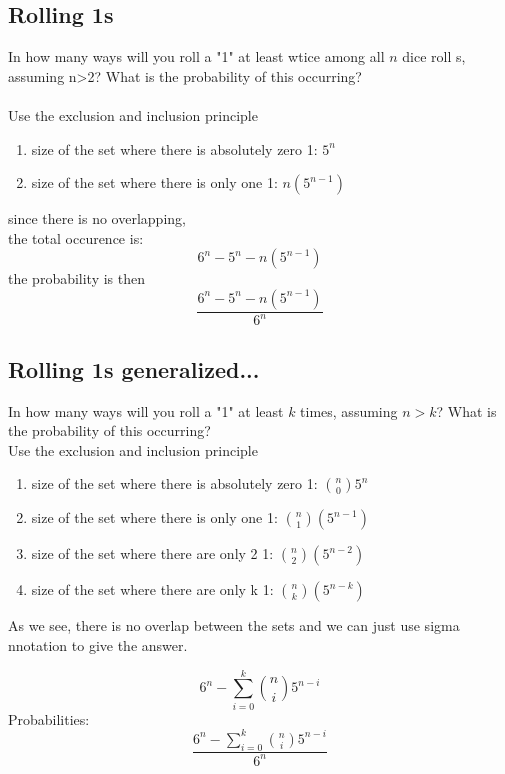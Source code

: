 \documentclass[a4paper,12pt]{article}
\begin{document}
\subsection{Rolling 1s}
In how many ways will you roll a "1" at least wtice among all $n$ dice roll s, assuming n>2? What is the probability of this occurring?\\
\bigskip\\
Use the exclusion and inclusion principle
\begin{enumerate}
  \item{size of the set where there is absolutely zero 1: $5^n$}
  \item{size of the set where there is only one 1: $n(5^{n-1})$}
\end{enumerate}
since there is no overlapping,\\
the total occurence is:
\[6^n - 5^n - n(5^{n-1})\]
the probability is then 
\[\frac{6^n - 5^n - n(5^{n-1})}{6^n}\]
\subsection{Rolling 1s generalized...}
In how many ways will you roll a "1" at least $k$ times, assuming $n > k$? 
What is the probability of this occurring?\\
Use the exclusion and inclusion principle
\begin{enumerate}
  \item{size of the set where there is absolutely zero 1: $\binom{n}{0}5^n$}
  \item{size of the set where there is only one 1: $\binom{n}{1}(5^{n-1})$}
  \item{size of the set where there are only 2 1: $\binom{n}{2}(5^{n-2})$} 
  \item{size of the set where there are only k 1: $\binom{n}{k}(5^{n-k})$} 
\end{enumerate}
As we see, there is no overlap between the sets and we can just use sigma nnotation to give the answer.

\[ 6^n - \sum ^k _{i=0} \binom{n}{i}5^{n-i} \]
Probabilities: \\
\[\frac{ 6^n - \sum ^k _{i=0} \binom{n}{i}5^{n-i}} {6^n}\]
\end{document}
